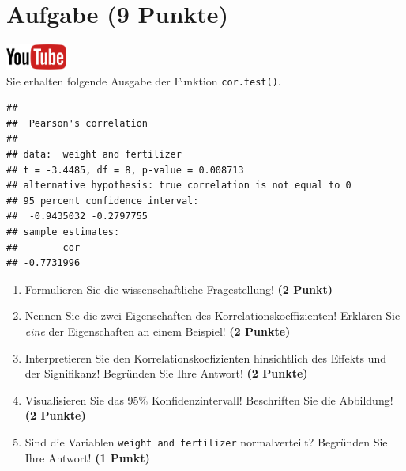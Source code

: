 \documentclass[a4paper, 9pt]{scrartcl}\usepackage[]{graphicx}\usepackage[]{xcolor}
\makeatletter
\newenvironment{kframe}{%
 \def\at@end@of@kframe{}%
 \ifinner\ifhmode%
  \def\at@end@of@kframe{\end{minipage}}%
  \begin{minipage}{\columnwidth}%
 \fi\fi%
 \def\FrameCommand##1{\hskip\@totalleftmargin \hskip-\fboxsep
 \colorbox{shadecolor}{##1}\hskip-\fboxsep
     \hskip-\linewidth \hskip-\@totalleftmargin \hskip\columnwidth}%
 \MakeFramed {\advance\hsize-\width
   \@totalleftmargin\z@ \linewidth\hsize
   \@setminipage}}%
 {\par\unskip\endMakeFramed%
 \at@end@of@kframe}
\newenvironment{knitrout}{}{} %
\makeatother
\begin{document}
 
\clearpage

\section{Aufgabe \hfill (9 Punkte)}

\hfill\href{https://youtu.be/C9skfFRTHhI}{\includegraphics[width =
   2cm]{img/youtube}}\\[1Ex]

Sie erhalten folgende \Rlogo Ausgabe der Funktion \texttt{cor.test()}.

\begin{knitrout}
\color{fgcolor}\begin{kframe}
\begin{verbatim}
## 
## 	Pearson's correlation
## 
## data:  weight and fertilizer
## t = -3.4485, df = 8, p-value = 0.008713
## alternative hypothesis: true correlation is not equal to 0
## 95 percent confidence interval:
##  -0.9435032 -0.2797755
## sample estimates:
##        cor 
## -0.7731996
\end{verbatim}
\end{kframe}
\end{knitrout}


\begin{enumerate}
  \item Formulieren Sie die wissenschaftliche Fragestellung! \textbf{(2
Punkt)}
\item Nennen Sie die zwei Eigenschaften des Korrelationskoeffizienten!
  Erkl{\"a}ren Sie \textit{eine} der Eigenschaften an einem Beispiel! \textbf{(2
    Punkte)}
\item Interpretieren Sie den Korrelationskoefizienten hinsichtlich des
  Effekts und der Signifikanz! Begr{\"u}nden Sie
  Ihre Antwort! \textbf{(2 Punkte)}
\item Visualisieren Sie das 95\% Konfidenzintervall! Beschriften Sie die Abbildung! \textbf{(2 Punkte)} 
\item Sind die Variablen \texttt{weight and fertilizer} normalverteilt?
  Begr{\"u}nden Sie Ihre Antwort! \textbf{(1 Punkt)}
\end{enumerate} 
\clearpage
\end{document}
